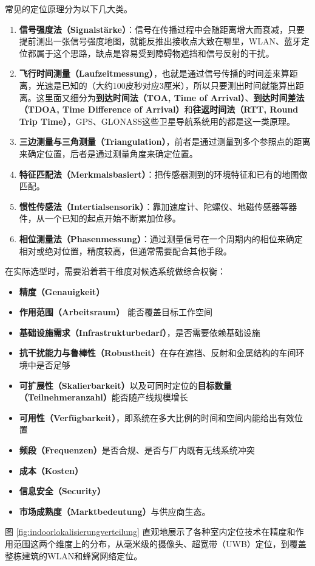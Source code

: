 常见的定位原理分为以下几大类。
\begin{enumerate}
    \item \textbf{信号强度法（Signalstärke）}：信号在传播过程中会随距离增大而衰减，只要提前测出一张信号强度地图，就能反推出接收点大致在哪里，WLAN、蓝牙定位都属于这个思路，缺点是容易受到障碍物遮挡和信号反射的干扰。
    \item \textbf{飞行时间测量（Laufzeitmessung）}，也就是通过信号传播的时间差来算距离，光速是已知的（大约100皮秒对应3厘米），所以只要测出时间就能算出距离。这里面又细分为\textbf{到达时间法（TOA, Time of Arrival）}、\textbf{到达时间差法（TDOA, Time Difference of Arrival）}和\textbf{往返时间法（RTT, Round Trip Time）}，GPS、GLONASS这些卫星导航系统用的都是这一类原理。
    \item \textbf{三边测量与三角测量（Triangulation）}，前者是通过测量到多个参照点的距离来确定位置，后者是通过测量角度来确定位置。
    \item \textbf{特征匹配法（Merkmalsbasiert）}：把传感器测到的环境特征和已有的地图做匹配。
    \item \textbf{惯性传感法（Intertialsensorik）}：靠加速度计、陀螺仪、地磁传感器等器件，从一个已知的起点开始不断累加位移。
    \item \textbf{相位测量法（Phasenmessung）}：通过测量信号在一个周期内的相位来确定相对或绝对位置，精度较高，但通常需要配合其他手段。
\end{enumerate}
在实际选型时，需要沿着若干维度对候选系统做综合权衡：
\begin{itemize}
  \item \textbf{精度（Genauigkeit）}
  \item \textbf{作用范围（Arbeitsraum）} 能否覆盖目标工作空间
  \item \textbf{基础设施需求（Infrastrukturbedarf）}，是否需要依赖基础设施
  \item \textbf{抗干扰能力与鲁棒性（Robustheit）}在存在遮挡、反射和金属结构的车间环境中是否足够
  \item \textbf{可扩展性（Skalierbarkeit）}以及可同时定位的\textbf{目标数量（Teilnehmeranzahl）}能否随产线规模增长
  \item \textbf{可用性（Verfügbarkeit）}，即系统在多大比例的时间和空间内能给出有效位置
  \item \textbf{频段（Frequenzen）}是否合规、是否与厂内既有无线系统冲突
  \item \textbf{成本（Kosten）}
  \item \textbf{信息安全（Security）}
  \item \textbf{市场成熟度（Marktbedeutung）}与供应商生态。
\end{itemize}
图 \ref{fig:indoorlokalisierungverteilung} 直观地展示了各种室内定位技术在精度和作用范围这两个维度上的分布，从毫米级的摄像头、超宽带（UWB）定位，到覆盖整栋建筑的WLAN和蜂窝网络定位。


